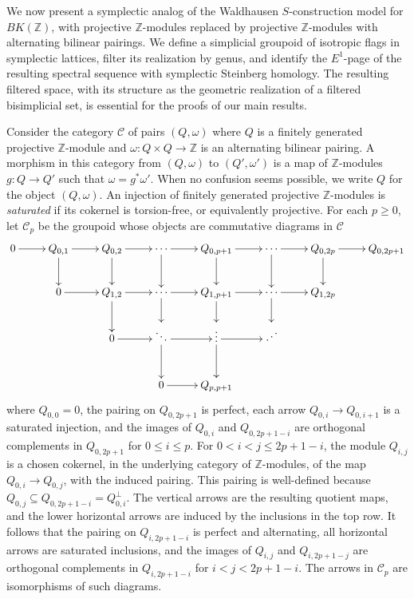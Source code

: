 \documentclass[12 pt]{amsart}
\newcommand{\ZZ}{\mathbb{Z}}
\newcommand{\cC}{\mathcal{C}}
\newcommand{\<}{\langle}
\renewcommand{\>}{\rangle}
\theoremstyle{definition}
\begin{document}
We now present a symplectic analog of the Waldhausen $S$-construction model for $BK(\ZZ)$, with projective $\ZZ$-modules replaced by projective $\ZZ$-modules with alternating bilinear pairings. We define a simplicial groupoid of isotropic flags in symplectic lattices, filter its realization by genus, and identify the $E^1$-page of the resulting spectral sequence with symplectic Steinberg homology. The resulting filtered space, with its structure as the geometric realization of a filtered bisimplicial set, is essential for the proofs of our main results.

Consider the category $\cC$ of pairs $(Q, \omega)$ where $Q$ is a finitely generated projective $\ZZ$-module and $\omega \colon Q \times Q \to \ZZ$ is an alternating bilinear pairing. A morphism in this category from $(Q, \omega)$ to $(Q', \omega')$ is a map of $\ZZ$-modules $g \colon Q \to Q'$ such that $\omega = g^* \omega'$. When no confusion seems possible, we write $Q$ for the object $(Q, \omega)$. An injection of finitely generated projective $\ZZ$-modules is \emph{saturated} if its cokernel is torsion-free, or equivalently projective. For each $p \geq 0$, let $\cC_p$ be the groupoid whose objects are commutative diagrams in $\cC$
\begin{equation} \label{eq:Qdiagram}
\begin{aligned}
\xymatrix {0 \ar[r] & Q_{0, 1} \ar[d] \ar[r] & Q_{0, 2} \ar[d] \ar[r] & \cdots \ar[d] \ar[r] & Q_{0, p + 1} \ar[d] \ar[r] &  \cdots \ar[d] \ar[r] & Q_{0, 2p} \ar[d] \ar[r] & Q_{0, 2p + 1} \\  & 0 \ar[r] & Q_{1, 2} \ar[d] \ar[r] & \cdots \ar[d] \ar[r]  & Q_{1, p + 1} \ar[d] \ar[r] & \cdots \ar[d] \ar[r] & Q_{1, 2p} & \\
& & 0 \ar[r] & \ddots \ar[d] \ar[r] & \vdots \ar[d] \ar[r] &  \iddots   & &\\ & & & 0  \ar[r] & Q_{p, p + 1}  & & &}
\end{aligned}
\end{equation}
where $Q_{0, 0} = 0$, the pairing on $Q_{0, 2p + 1}$ is perfect, each arrow $Q_{0, i} \to Q_{0, i + 1}$ is a saturated injection, and the images of $Q_{0, i}$ and $Q_{0, 2p + 1 - i}$ are orthogonal complements in $Q_{0, 2p + 1}$ for $0 \leq i \leq p$. For $0 < i < j \leq 2p + 1 - i$, the module $Q_{i, j}$ is a chosen cokernel, in the underlying category of $\ZZ$-modules, of the map $Q_{0, i} \to Q_{0, j}$, with the induced pairing. This pairing is well-defined because $Q_{0, j} \subseteq Q_{0, 2p + 1 - i} = Q_{0, i}^{\perp}$. The vertical arrows are the resulting quotient maps, and the lower horizontal arrows are induced by the inclusions in the top row. It follows that the pairing on $Q_{i, 2p + 1 - i}$ is perfect and alternating, all horizontal arrows are saturated inclusions, and the images of $Q_{i, j}$ and $Q_{i, 2p + 1 - j}$ are orthogonal complements in $Q_{i, 2p + 1 - i}$ for $i < j < 2p + 1 - i$. The arrows in $\cC_p$ are isomorphisms of such diagrams.
\end{document}
